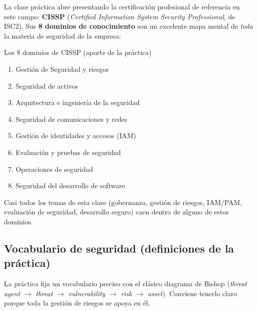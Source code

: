 \documentclass[11pt,a4paper]{article}
\begin{document}
La clase práctica abre presentando la certificación profesional de referencia en este campo:
\textbf{CISSP} (\emph{Certified Information System Security Professional}, de ISC2). Sus
\textbf{8 dominios de conocimiento} son un excelente mapa mental de \emph{toda} la materia de
seguridad de la empresa:

\begin{practbox}{Los 8 dominios de CISSP (aporte de la práctica)}
\begin{enumerate}[leftmargin=1.6em,itemsep=1pt]
  \item Gestión de Seguridad y riesgos
  \item Seguridad de activos
  \item Arquitectura e ingeniería de la seguridad
  \item Seguridad de comunicaciones y redes
  \item Gestión de identidades y accesos (IAM)
  \item Evaluación y pruebas de seguridad
  \item Operaciones de seguridad
  \item Seguridad del desarrollo de software
\end{enumerate}
Casi todos los temas de esta clase (gobernanza, gestión de riesgos, IAM/PAM, evaluación de
seguridad, desarrollo seguro) caen dentro de alguno de estos dominios.
\end{practbox}

\subsection{Vocabulario de seguridad (definiciones de la práctica)}

La práctica fija un vocabulario preciso con el clásico diagrama de Bishop
(\emph{threat agent $\to$ threat $\to$ vulnerability $\to$ risk $\to$ asset}). Conviene
tenerlo claro porque toda la gestión de riesgos se apoya en él.
\end{document}
